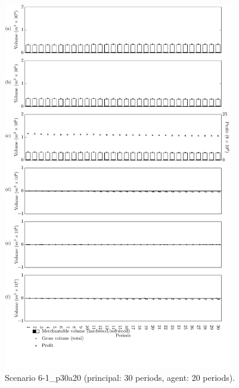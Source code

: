 \begin{figure}[h]
  \centering
  \includegraphics[width=10cm]{images/appendix/s6-1_p30a20}
  \caption{Scenario 6-1\_p30a20 (principal: 30 periods, agent: 20 periods).}
  \label{fig:s6-1_p30a20}
\end{figure}

